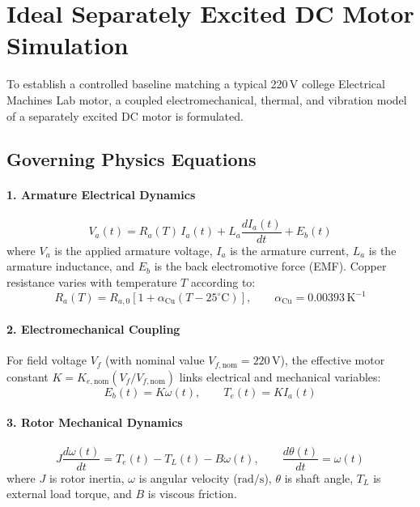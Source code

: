\documentclass[11pt,a4paper]{article}
\begin{document}
\section{Ideal Separately Excited DC Motor Simulation}

To establish a controlled baseline matching a typical 220\,V college Electrical Machines Lab motor, a coupled electromechanical, thermal, and vibration model of a separately excited DC motor is formulated.

\subsection{Governing Physics Equations}

\paragraph{1. Armature Electrical Dynamics}
\begin{equation}
    V_a(t) = R_a(T)\,I_a(t) + L_a \frac{dI_a(t)}{dt} + E_b(t)
    \label{eq:elec}
\end{equation}
where $V_a$ is the applied armature voltage, $I_a$ is the armature current, $L_a$ is the armature inductance, and $E_b$ is the back electromotive force (EMF). Copper resistance varies with temperature $T$ according to:
\begin{equation}
    R_a(T) = R_{a,0}\left[1 + \alpha_{\text{Cu}}\left(T - 25^\circ\text{C}\right)\right], \qquad \alpha_{\text{Cu}} = 0.00393\,\text{K}^{-1}
\end{equation}

\paragraph{2. Electromechanical Coupling}
For field voltage $V_f$ (with nominal value $V_{f,\text{nom}} = 220\,\text{V}$), the effective motor constant $K = K_{e,\text{nom}}(V_f / V_{f,\text{nom}})$ links electrical and mechanical variables:
\begin{equation}
    E_b(t) = K\omega(t), \qquad T_e(t) = K I_a(t)
    \label{eq:coupling}
\end{equation}

\paragraph{3. Rotor Mechanical Dynamics}
\begin{equation}
    J \frac{d\omega(t)}{dt} = T_e(t) - T_L(t) - B\omega(t), \qquad \frac{d\theta(t)}{dt} = \omega(t)
    \label{eq:mech}
\end{equation}
where $J$ is rotor inertia, $\omega$ is angular velocity ($\text{rad/s}$), $\theta$ is shaft angle, $T_L$ is external load torque, and $B$ is viscous friction.
\end{document}
